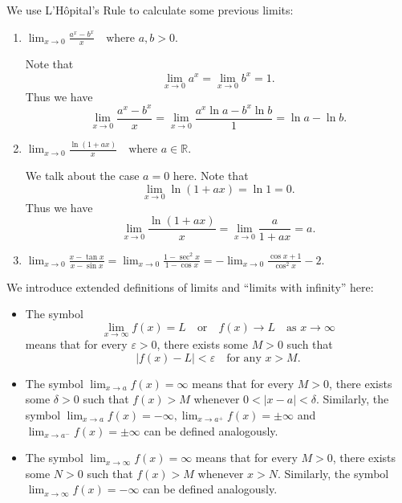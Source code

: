 \documentclass[a4paper]{ctexart}
\begin{document}
        \begin{myex}
            We use L'Hôpital's Rule to calculate some previous limits:
            \begin{enumerate}[label=(\arabic*)]
                \item \(\displaystyle
            \lim_{x\to 0} \frac{a^x - b^x}{x} \quad \text{where } a,b>0.
            \)

            Note that
            \[
            \lim_{x\to 0} a^x = \lim_{x\to 0} b^x = 1.
            \]
            Thus we have
            \[
            \lim_{x\to 0} \frac{a^x - b^x}{x} = \lim_{x\to 0} \frac{a^x \ln a - b^x \ln b}{1} = \ln a - \ln b.
            \]
                \item \(\displaystyle
            \lim_{x\to 0} \frac{\ln(1+ax)}{x} \quad \text{where } a\in \mathbb{R}.
            \)

            We talk about the case $a=0$ here. Note that
            \[
            \lim_{x\to 0} \ln(1+ax) = \ln 1 = 0.
            \]
            Thus we have
            \[
            \lim_{x\to 0} \frac{\ln(1+ax)}{x} = \lim_{x\to 0} \frac{a}{1+ax} = a.
            \]
            \item $\displaystyle \lim_{x\to 0} \frac{x-\tan x}{x-\sin x} = \lim_{x\to 0}\frac{1-\sec^2 x}{1-\cos x} =-\lim_{x\to 0} \frac{\cos x+1}{\cos^2 x} -2$.
            \end{enumerate}
        \end{myex}
        \begin{mydef}
            We introduce extended definitions of limits and ``limits with infinity'' here:
            \begin{itemize}
                \item The symbol
                \[
                \lim_{x\to \infty} f(x) = L \quad \text{or} \quad f(x) \to L \quad \text{as } x\to \infty
                \]
                means that for every $\varepsilon > 0$, there exists some $M>0$ such that \[|f(x) - L| < \varepsilon \quad \text{for any } x > M. \]
                \item The symbol $\displaystyle \lim_{x\to a} f(x) = \infty$ means that for every $M>0$, there exists some $\delta > 0$ such that $f(x) > M$ whenever $0 < |x-a| < \delta$. Similarly, the symbol $\displaystyle \lim_{x\to a} f(x) = -\infty, \displaystyle \lim_{x\to a^+} f(x) = \pm \infty$ and $\displaystyle \lim_{x\to a^-} f(x) = \pm \infty$ can be defined analogously.
                \item The symbol $\displaystyle \lim_{x\to \infty} f(x) = \infty$ means that for every $M>0$, there exists some $N>0$ such that $f(x) > M$ whenever $x > N$. Similarly, the symbol $\displaystyle \lim_{x\to \infty} f(x) = -\infty$ can be defined analogously.
            \end{itemize}
        \end{mydef}
\end{document}
